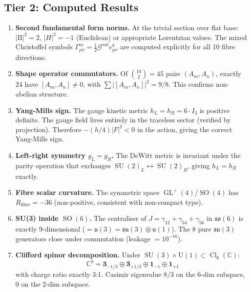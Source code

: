 \documentclass[12pt,a4paper]{article}
\DeclareMathOperator{\SO}{SO}
\DeclareMathOperator{\SU}{SU}
\DeclareMathOperator{\GL}{GL}
\DeclareMathOperator{\Cl}{Cl}
\begin{document}
\subsection{Tier 2: Computed Results}

\begin{computedbox}

\begin{enumerate}
\item \textbf{Second fundamental form norms.} At the trivial section over flat base: $|\mathrm{II}|^2 = 2$, $|H|^2 = -1$ (Euclidean) or appropriate Lorentzian values. The mixed Christoffel symbols $\Gamma^m_{\mu\nu} = \frac{1}{2}\mathcal{G}^{mk}e^k_{\mu\nu}$ are computed explicitly for all 10 fibre directions.

\item \textbf{Shape operator commutators.} Of $\binom{10}{2} = 45$ pairs $(A_m, A_n)$, exactly 24 have $[A_m, A_n] \neq 0$, with $\sum|[A_m,A_n]|^2 = 9/8$. This confirms non-abelian structure.

\item \textbf{Yang-Mills sign.} The gauge kinetic metric $h_L = h_R = 6\cdot I_3$ is positive definite. The gauge field lives entirely in the traceless sector (verified by projection). Therefore $-(h/4)|F|^2 < 0$ in the action, giving the correct Yang-Mills sign.

\item \textbf{Left-right symmetry $g_L = g_R$.} The DeWitt metric is invariant under the parity operation that exchanges $\SU(2)_L \leftrightarrow \SU(2)_R$, giving $h_L = h_R$ exactly.

\item \textbf{Fibre scalar curvature.} The symmetric space $\GL^+(4)/\SO(4)$ has $R_{\text{fibre}} = -36$ (non-positive, consistent with non-compact type).

\item \textbf{SU(3) inside $\SO(6)$.} The centraliser of $J = \gamma_{12}+\gamma_{34}+\gamma_{56}$ in $\mathfrak{so}(6)$ is exactly 9-dimensional ($= \mathfrak{u}(3) = \mathfrak{su}(3) \oplus \mathfrak{u}(1)$). The 8 pure $\mathfrak{su}(3)$ generators close under commutation (leakage $= 10^{-16}$).

\item \textbf{Clifford spinor decomposition.} Under $\SU(3) \times \mathrm{U}(1) \subset \Cl_6(\mathbb{C})$:
\begin{equation}
\mathbb{C}^8 = \mathbf{3}_{-1/3} \oplus \overline{\mathbf{3}}_{+1/3} \oplus \mathbf{1}_{-1} \oplus \mathbf{1}_{+1}
\end{equation}
with charge ratio exactly 3:1. Casimir eigenvalue $8/3$ on the 6-dim subspace, $0$ on the 2-dim subspace.


\end{enumerate}
\end{computedbox}
\end{document}
